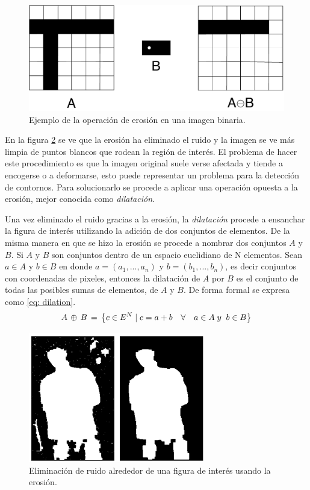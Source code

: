 \begin{figure}
\centering 
\includegraphics[scale=0.7]{images/erosion_diagram.pdf}
\caption{Ejemplo de la operación de erosión en una imagen binaria.}
\label{fig:erosion_diagram}
\end{figure}

En la figura \ref{fig:erosion_example} se ve que la erosión ha eliminado el ruido y la imagen se ve más limpia de puntos blancos que rodean la región de interés. El problema de hacer este procedimiento es que la imagen original suele verse afectada y tiende a encogerse o a deformarse, esto puede representar un problema para la detección de contornos. Para solucionarlo se procede a aplicar una operación opuesta a la erosión, mejor conocida como \textit{dilatación}.

Una vez eliminado el ruido gracias a la erosión, la \textit{dilatación} procede a ensanchar la figura de interés utilizando la adición de dos conjuntos de elementos. De la misma manera en que se hizo la erosión se procede a nombrar dos conjuntos $A$ y $B$. Si $A$ y $B$ son conjuntos dentro de un espacio euclidiano de N elementos. Sean $a \in A$ y $b \in B$ en donde $a=(a_1, ... ,a_n)$ y $b=(b_1,...,b_n)$, es decir conjuntos con coordenadas de pixeles, entonces la dilatación de $A$ por $B$ es el conjunto de todas las posibles sumas de elementos, de $A$ y $B$. De forma formal se expresa como \ref{eq: dilation}.
\begin{equation}
A\thinspace\oplus\thinspace B\thinspace=\thinspace \left \{ c \in E^N  \mid c=a+b \quad\forall \quad a \in A \; y\; \; b \in B\right \}
\label{eq: dilation}
\end{equation}


\begin{figure}
\centering
\includegraphics[scale=1]{images/erosion_example.png}
\caption{Eliminación de ruido alrededor de una figura de interés usando la erosión.}
\label{fig:erosion_example}
\end{figure}

